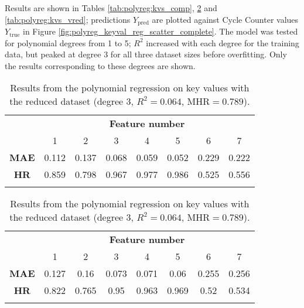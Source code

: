 Results are shown in Tables \ref{tab:polyreg:kvs_comp}, \ref{tab:polyreg:kvs_red} and \ref{tab:polyreg:kvs_vred}; predictions \(Y_{\text{pred}}\) are plotted against Cycle Counter values \(Y_{\text{true}}\) in Figure \ref{fig:polyreg_keyval_reg_scatter_complete}. The model was tested for polynomial degrees from 1 to 5; \(R^2\) increased with each degree for the training data, but peaked at degree 3 for all three dataset sizes before overfitting. Only the results corresponding to these degrees are shown.

\begin{table}
    \begin{center}
        \caption{\label{tab:polyreg:kvs_comp} Results from the polynomial regression on key values with the complete dataset (degree 3, \(R^2 = 0.252\), \(\text{MHR} = 0.810\)).}
        \begin{tabular}{ >{\bfseries}c c c c c c c c }
            \multirow{2}{*}{\textbf{Measure}} & \multicolumn{7}{c}{\textbf{Feature number}} \\
             & 1 & 2 & 3 & 4 & 5 & 6 & 7 \\
            \midrule
            MAE & 0.112 & 0.137 & 0.068 & 0.059 & 0.052 & 0.229 & 0.222 \\
            HR  & 0.859 & 0.798 & 0.967 & 0.977 & 0.986 & 0.525 & 0.556 \\
            \\
        \end{tabular}

        \caption{\label{tab:polyreg:kvs_red} Results from the polynomial regression on key values with the reduced dataset (degree 3, \(R^2 = 0.064\), \(\text{MHR} = 0.789\)).}
        \begin{tabular}{ >{\bfseries}c c c c c c c c }
            \multirow{2}{*}{\textbf{Measure}} & \multicolumn{7}{c}{\textbf{Feature number}} \\
             & 1 & 2 & 3 & 4 & 5 & 6 & 7 \\
            \midrule
            MAE & 0.127 & 0.16 & 0.073 & 0.071 & 0.06 & 0.255 & 0.256 \\
            HR  & 0.822 & 0.765 & 0.95 & 0.963 & 0.969 & 0.52 & 0.534 \\
            \\
        \end{tabular}


\end{center}
\end{table}
